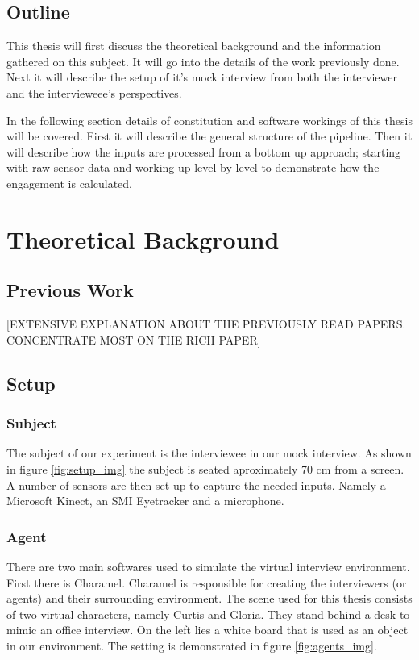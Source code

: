 \documentclass[12pt, a4paper, fleqn]{memoir}%
\begin{document}
\section{Outline}
\label{sec:Outline}
This thesis will first discuss the theoretical background and the information gathered on this subject. It will go into the details of the work previously done. Next it will describe the setup of it's mock interview from both the interviewer and the intervieweee's perspectives.

In the following section details of constitution and software workings of this thesis will be covered. First it will describe the general structure of the pipeline. Then it will describe how the inputs are processed from a bottom up approach; starting with raw sensor data and working up level by level to demonstrate how the engagement is calculated.

\chapter{Theoretical Background}
\label{chap:TheoreticalBackground}

\section{Previous Work}
\label{sec:PreviousWork}

[EXTENSIVE EXPLANATION ABOUT THE PREVIOUSLY READ PAPERS. CONCENTRATE MOST ON THE RICH PAPER]

\section{Setup}
\label{sec:Section}

\subsection{Subject}
\label{subsec:Subject}
The subject of our experiment is the interviewee in our mock interview. As shown in figure \ref{fig:setup_img} the subject is seated aproximately 70 cm from a screen. A number of sensors are then set up to capture the needed inputs. Namely a Microsoft Kinect, an SMI Eyetracker and a microphone.

\subsection{Agent}
\label{subsec:Agent}
There are two main softwares used to simulate the virtual interview environment. First there is Charamel. Charamel is responsible for creating the interviewers (or agents) and their surrounding environment. The scene used for this thesis consists of two virtual characters, namely Curtis and Gloria. They stand behind a desk to mimic an office interview. On the left lies a white board that is used as an object in our environment. The setting is demonstrated in figure \ref{fig:agents_img}.
\end{document}
